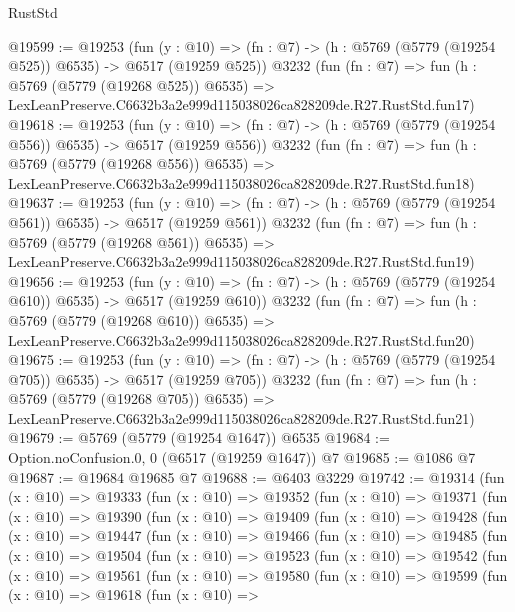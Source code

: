 \begin{lexlean}{RustStd}
\begin{coremodule}
@19599 := @19253
    (fun (y : @10) => (fn : @7) -> (h : @5769 (@5779 (@19254 @525)) @6535) -> @6517 (@19259 @525))
    @3232
    (fun (fn : @7) =>
    fun (h : @5769 (@5779 (@19268 @525)) @6535) =>
    LexLeanPreserve.C6632b3a2e999d115038026ca828209de.R27.RustStd.fun17)
@19618 := @19253
    (fun (y : @10) => (fn : @7) -> (h : @5769 (@5779 (@19254 @556)) @6535) -> @6517 (@19259 @556))
    @3232
    (fun (fn : @7) =>
    fun (h : @5769 (@5779 (@19268 @556)) @6535) =>
    LexLeanPreserve.C6632b3a2e999d115038026ca828209de.R27.RustStd.fun18)
@19637 := @19253
    (fun (y : @10) => (fn : @7) -> (h : @5769 (@5779 (@19254 @561)) @6535) -> @6517 (@19259 @561))
    @3232
    (fun (fn : @7) =>
    fun (h : @5769 (@5779 (@19268 @561)) @6535) =>
    LexLeanPreserve.C6632b3a2e999d115038026ca828209de.R27.RustStd.fun19)
@19656 := @19253
    (fun (y : @10) => (fn : @7) -> (h : @5769 (@5779 (@19254 @610)) @6535) -> @6517 (@19259 @610))
    @3232
    (fun (fn : @7) =>
    fun (h : @5769 (@5779 (@19268 @610)) @6535) =>
    LexLeanPreserve.C6632b3a2e999d115038026ca828209de.R27.RustStd.fun20)
@19675 := @19253
    (fun (y : @10) => (fn : @7) -> (h : @5769 (@5779 (@19254 @705)) @6535) -> @6517 (@19259 @705))
    @3232
    (fun (fn : @7) =>
    fun (h : @5769 (@5779 (@19268 @705)) @6535) =>
    LexLeanPreserve.C6632b3a2e999d115038026ca828209de.R27.RustStd.fun21)
@19679 := @5769 (@5779 (@19254 @1647)) @6535
@19684 := Option.noConfusion.{0, 0} (@6517 (@19259 @1647)) @7
@19685 := @1086 @7
@19687 := @19684 @19685 @7
@19688 := @6403 @3229
@19742 := @19314
    (fun (x : @10) =>
    @19333
      (fun (x : @10) =>
      @19352
        (fun (x : @10) =>
        @19371
          (fun (x : @10) =>
          @19390
            (fun (x : @10) =>
            @19409
              (fun (x : @10) =>
              @19428
                (fun (x : @10) =>
                @19447
                  (fun (x : @10) =>
                  @19466
                    (fun (x : @10) =>
                    @19485
                      (fun (x : @10) =>
                      @19504
                        (fun (x : @10) =>
                        @19523
                          (fun (x : @10) =>
                          @19542
                            (fun (x : @10) =>
                            @19561
                              (fun (x : @10) =>
                              @19580
                                (fun (x : @10) =>
                                @19599
                                  (fun (x : @10) =>
                                  @19618
                                    (fun (x : @10) =>

\end{coremodule}
\end{lexlean}
